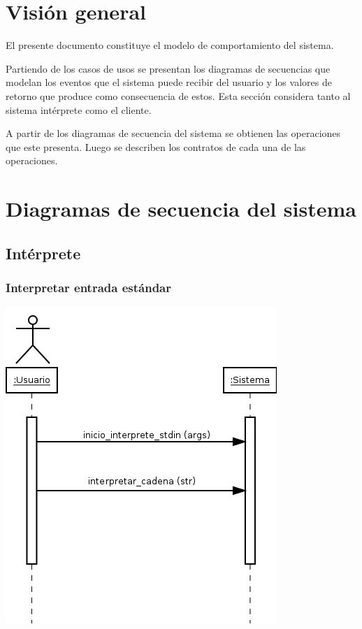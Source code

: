 \section{Visión general}
El presente documento constituye el modelo de comportamiento del sistema.

Partiendo de los casos de usos se presentan los diagramas de secuencias que modelan 
los eventos que el sistema puede recibir del usuario y los valores de retorno
que produce como consecuencia de estos.  Esta sección considera tanto al sistema intérprete
como el cliente.

A partir de los diagramas de secuencia del sistema se obtienen las operaciones 
que este presenta. Luego se describen los contratos de cada una de las operaciones.  
\section{Diagramas de secuencia del sistema}
\subsection{Intérprete}
\subsubsection{Interpretar entrada estándar}
\begin{center}
\includegraphics[scale=0.4]{interpretar_stdin.png} \\
\end{center}

